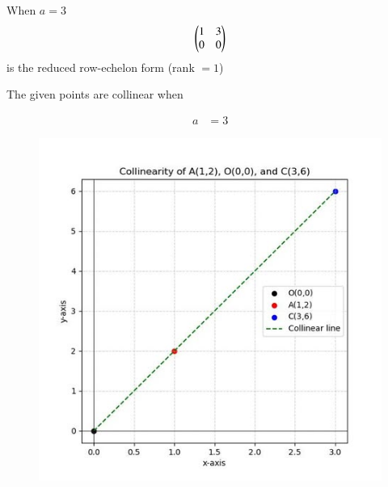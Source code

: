 \documentclass[journal]{IEEEtran}
\begin{document}
When $a=3$
\[
\begin{pmatrix}1 & 3 \\ 0 & 0\end{pmatrix}
\]
is the reduced row-echelon form (rank $=1$)




The given points are collinear when

\begin{align}
a &= 3
\end{align}

\begin{figure}[H]
    \centering
    \includegraphics[scale=0.6]{figs/1.7.2.jpg}
    \caption{}
    \label{fig:1}
\end{figure}
\end{document}
